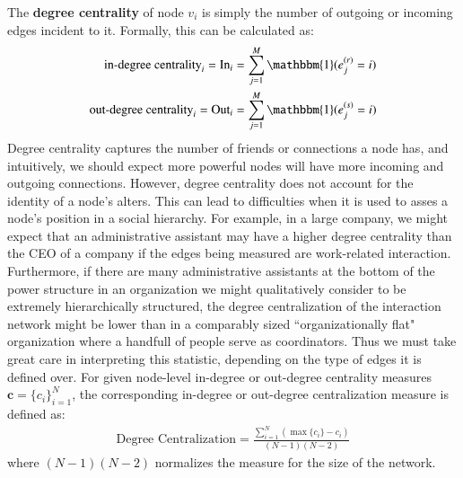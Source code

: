 \documentclass[3p,times]{elsarticle}
\begin{document}
The \textbf{degree centrality} of node $v_{i}$ is simply the number of outgoing or incoming edges incident to it. Formally, this can be calculated as:
\begin{align}
	\text{in-degree centrality}_i = \text{In}_i&= \sum_{j=1}^M \mathbbm{1}(e_j^{(r)} = i) \\
	\text{out-degree centrality}_i  = \text{Out}_i &= \sum_{j=1}^M \mathbbm{1}(e_j^{(s)} = i) 
\end{align}
Degree centrality captures the number of friends or connections a node has, and intuitively, we should expect more powerful nodes will have more incoming and outgoing connections. However, degree centrality does not account for the identity of a node's alters. This can lead to difficulties when it is used to asses a node's position in a social hierarchy. For example, in a large company, we might expect that an administrative assistant may have a higher degree centrality than the CEO of a company if the edges being measured are work-related interaction. Furthermore, if there are many administrative assistants at the bottom of the power structure in an organization we might qualitatively consider to be extremely hierarchically structured, the degree centralization of the interaction network might be lower than in a comparably sized ``organizationally flat" organization where a handfull of people serve as coordinators. Thus we must take great care in interpreting this statistic, depending on the type of edges it is defined over. For given node-level in-degree or out-degree centrality measures $\mathbf{c} = \{c_i\}_{i=1}^N$, the corresponding in-degree or out-degree centralization measure is defined as: 
\begin{align}
	\text{Degree Centralization} = \frac{\sum_{i=1}^{N}{(\max\{c_{i}\}-c_{i})}}{(N-1)(N-2)}
\end{align}
where $(N-1)(N-2)$ normalizes the measure for the size of the network.
\end{document}
